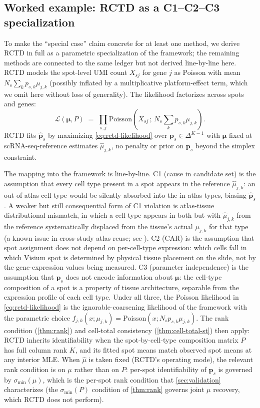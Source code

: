 \subsection{Worked example: RCTD as a C1--C2--C3 specialization}
\label{sec:rctd-worked}

To make the ``special case'' claim concrete for at least one method,
we derive RCTD \citep{cable2021robust} in full as a parametric
specialization of the framework; the remaining methods are connected to
the same ledger but not derived line-by-line here. RCTD models the spot-level UMI count $X_{sj}$ for gene
$j$ as Poisson with mean $N_s \sum_k p_{s,k} \mu_{j,k}$ (possibly
inflated by a multiplicative platform-effect term, which we omit
here without loss of generality). The likelihood factorizes across
spots and genes:
\begin{equation}
  \mathcal L(\bm \mu, P) \;=\; \prod_{s, j} \mathrm{Poisson}\!\left(X_{sj}
    \,;\, N_s \textstyle\sum_k p_{s,k}\mu_{j,k}\right).
  \label{eq:rctd-likelihood}
\end{equation}
RCTD fits $\hat{\bm p}_s$ by maximizing
\eqref{eq:rctd-likelihood} over $\bm p_s \in \Delta^{K-1}$ with
$\bm\mu$ fixed at scRNA-seq-reference estimates $\hat\mu_{j,k}$, no
penalty or prior on $\bm p_s$ beyond the simplex constraint.

The mapping into the framework is line-by-line. C1 (cause in
candidate set) is the assumption that every cell type present in a
spot appears in the reference $\hat\mu_{j,k}$: an out-of-atlas cell
type would be silently absorbed into the in-atlas types, biasing
$\hat{\bm p}_s$. A weaker but still consequential form of C1
violation is atlas-tissue distributional mismatch, in which a
cell type appears in both but with $\hat\mu_{j,k}$ from the
reference systematically displaced from the tissue's actual
$\mu_{j,k}$ for that type (a known issue in cross-study atlas
reuse; see \citet{tasic2018shared}). C2 (CAR) is the assumption that spot assignment
does not depend on per-cell-type expression: which cells fall in
which Visium spot is determined by physical tissue placement on the
slide, not by the gene-expression values being measured. C3
(parameter independence) is the assumption that $\bm p_s$ does not
encode information about $\bm \mu$: the cell-type composition of a
spot is a property of tissue architecture, separable from the
expression profile of each cell type. Under all three, the Poisson
likelihood in \eqref{eq:rctd-likelihood} is the ignorable-coarsening
likelihood of the framework with the parametric choice
$f_{j,k}(x; \mu_{j,k}) = \mathrm{Poisson}(x; N_s p_{s,k}\mu_{j,k})$.
The rank condition (\cref{thm:rank}) and cell-total consistency
(\cref{thm:cell-total-st}) then apply: RCTD inherits
identifiability when the spot-by-cell-type composition matrix
$P$ has full column rank $K$, and its fitted spot means match
observed spot means at any interior MLE. When $\hat\mu$ is taken
fixed (RCTD's operating mode), the relevant rank condition is on
$\mu$ rather than on $P$: per-spot identifiability of $\bm p_s$ is
governed by $\sigma_{\min}(\mu)$, which is the per-spot rank
condition that \cref{sec:validation} characterizes (the
$\sigma_{\min}(P)$ condition of \cref{thm:rank} governs joint
$\mu$ recovery, which RCTD does not perform).

